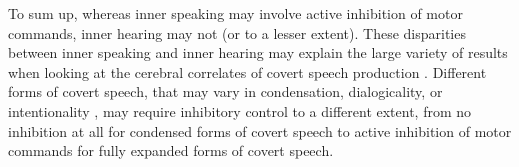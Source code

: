 \documentclass[utf8]{template/frontiersSCNS} %
\begin{document}
To sum up, whereas inner speaking may involve active inhibition of motor commands, inner hearing may not (or to a lesser extent). These disparities between inner speaking and inner hearing may explain the large variety of results when looking at the cerebral correlates of covert speech production \citep[as reviewed for instance in][]{geva_inner_2018}. Different forms of covert speech, that may vary in condensation, dialogicality, or intentionality \citep{grandchamp_condialint_2019}, may require inhibitory control to a different extent, from no inhibition at all for condensed forms of covert speech to active inhibition of motor commands for fully expanded forms of covert speech.



\end{document}
